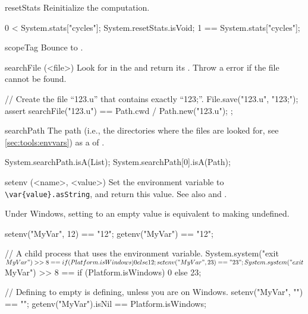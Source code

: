 \begin{urbiscriptapi}
\item[resetStats]%
  Reinitialize the  computation.
\begin{urbiassert}
 0  < System.stats["cycles"];
System.resetStats.isVoid;
 1 == System.stats["cycles"];
\end{urbiassert}


\item[scopeTag] Bounce to .


\item[searchFile](<file>)%
  Look for  in the  and return its
  .  Throw a  error if the
  file cannot be found.
\begin{urbiscript}
// Create the file ``123.u'' that contains exactly ``123;''.
File.save("123.u", "123;");
assert
{
  searchFile("123.u") == Path.cwd / Path.new("123.u");
};
\end{urbiscript}


\item[searchPath] The \urbi path (i.e., the directories where the \us files
  are looked for, see \autoref{sec:tools:envvars}) as a  of
  .
\begin{urbiassert}
System.searchPath.isA(List);
System.searchPath[0].isA(Path);
\end{urbiassert}


\item[setenv](<name>, <value>)%
  Set the environment variable  to
  \lstinline|\var{value}.asString|, and return this value.  See also
   and .
  \begin{windows}
    Under Windows, setting to an empty value is equivalent to
    making undefined.
  \end{windows}

\begin{urbiassert}
setenv("MyVar", 12) == "12";
getenv("MyVar") == "12";

// A child process that uses the environment variable.
System.system("exit $MyVar") >> 8 ==
       {if (Platform.isWindows) 0 else 12};
setenv("MyVar", 23) == "23";
System.system("exit $MyVar") >> 8 ==
       {if (Platform.isWindows) 0 else 23};

// Defining to empty is defining, unless you are on Windows.
setenv("MyVar", "") == "";
getenv("MyVar").isNil == Platform.isWindows;
\end{urbiassert}



\end{urbiscriptapi}
